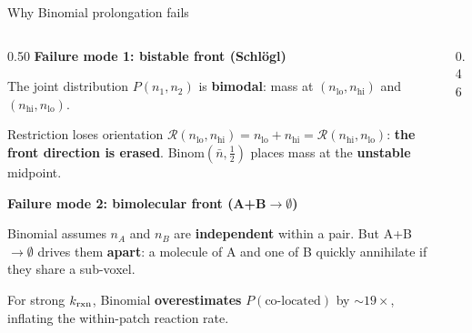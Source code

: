 \documentclass[10pt,aspectratio=169]{beamer}
\newcommand{\calR}{\mathcal{R}}
\begin{document}
\begin{frame}{Why Binomial prolongation fails}

  \begin{columns}[T]
    \begin{column}{0.50\textwidth}
      \textbf{Failure mode 1: bistable front (Schl\"{o}gl)}

      \smallskip
      The joint distribution $P(n_1, n_2)$ is \textbf{bimodal}:
      mass at $(n_\text{lo}, n_\text{hi})$ and $(n_\text{hi}, n_\text{lo})$.

      \begin{alertblock}{Restriction loses orientation}
        $\calR(n_\text{lo}, n_\text{hi}) = n_\text{lo}+n_\text{hi} = \calR(n_\text{hi}, n_\text{lo})$:
        \textbf{the front direction is erased}.
        Binom$(\bar n,\tfrac12)$ places mass at the \textbf{unstable} midpoint.
      \end{alertblock}

      \medskip\medskip
      \textbf{Failure mode 2: bimolecular front (A+B$\to\emptyset$)}

      \smallskip
      Binomial assumes $n_A$ and $n_B$ are \textbf{independent} within a pair.
      But A+B$\to\emptyset$ drives them \textbf{apart}: a molecule of A and one
      of B quickly annihilate if they share a sub-voxel.

      \smallskip
      For strong $k_{\rm rxn}$, Binomial \textbf{overestimates} $P(\text{co-located})$
      by ${\sim}19\times$, inflating the within-patch reaction rate.
    \end{column}

    \begin{column}{0.46\textwidth}
      \begin{center}
      \end{center}


\end{column}
\end{columns}
\end{frame}
\end{document}
